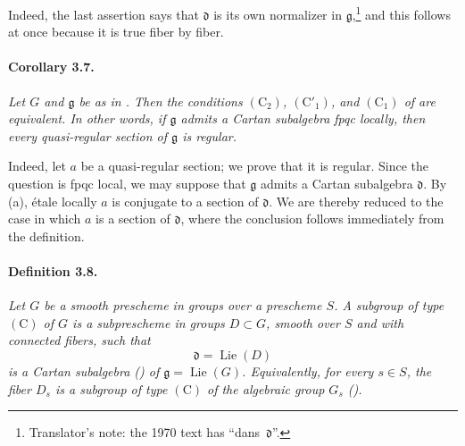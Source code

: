 Indeed, the last assertion says that \(\mathfrak d\) is its own
normalizer in \(\mathfrak g\),\footnote{Translator's note: the 1970 text has ``dans~\(\mathfrak d\)''.} and this follows at once because it
is true fiber by fiber.

\paragraph{\textbf{Corollary 3.7.}}
{\itshape Let \(G\) and \(\mathfrak g\) be as in . Then the
conditions \((\mathrm C_2)\), \((\mathrm C'_1)\), and
\((\mathrm C_1)\) of  are equivalent. In other words, if
\(\mathfrak g\) admits a Cartan subalgebra fpqc locally, then every
quasi-regular section of \(\mathfrak g\) is regular.}

Indeed, let \(a\) be a quasi-regular section; we prove that it is
regular. Since the question is fpqc local, we may suppose that
\(\mathfrak g\) admits a Cartan subalgebra \(\mathfrak d\). By
\textup{(a)}, étale locally \(a\) is conjugate to a section of
\(\mathfrak d\). We are thereby reduced to the case in which
\(a\) is a section of \(\mathfrak d\), where the conclusion follows
immediately from the definition.

\paragraph{\textbf{Definition 3.8.}}
{\itshape Let \(G\) be a smooth prescheme in groups over a
prescheme \(S\). A \emph{subgroup of type \((\mathrm C)\)} of
\(G\) is a subprescheme in groups \(D\subset G\), smooth over
\(S\) and with connected fibers, such that
\[
  \mathfrak d=\operatorname{Lie}(D)
\]
is a Cartan subalgebra \textup{()} of
\(\mathfrak g=\operatorname{Lie}(G)\). Equivalently, for every
\(s\in S\), the fiber \(D_s\) is a subgroup of type
\((\mathrm C)\) of the algebraic group \(G_s\)
\textup{()}.}
